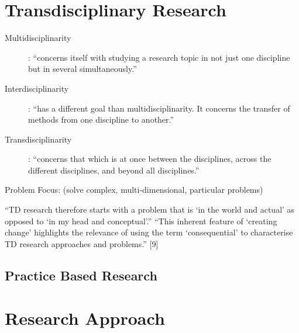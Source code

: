 \section{Transdisciplinary Research}

\begin{description}
  \item [Multidisciplinarity]:	``concerns itself with studying a research topic in not just one discipline but in several simultaneously.''
  \item [Interdisciplinarity]:	``has a different goal than multidisciplinarity. It concerns the transfer of methods from one discipline to another.''
  \item [Transdisciplinarity]:	``concerns that which is at once between the disciplines, across the different disciplines, and beyond all disciplines.''
\end{description} \autocite{Nicolescu2010}

Problem Focus: (solve complex, multi-dimensional, particular problems)

``TD research therefore starts with a problem that is `in the world and actual' as opposed to `in my head and conceptual'.'' ``This inherent feature of `creating change' highlights the relevance of using the term `consequential' to characterise TD research approaches and problems.'' [9]

\subsection{Practice Based Research}

\section{Research Approach}




